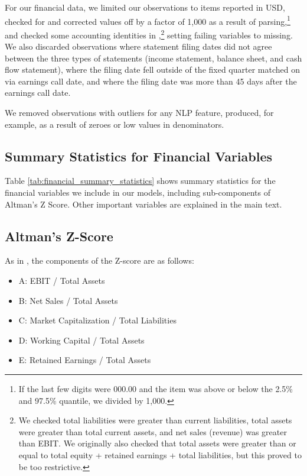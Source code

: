 \documentclass{article}[11pt]
\begin{document}
    For our financial data, we limited our observations to items reported in USD, checked for and corrected values off by a factor of 1,000 as a result of parsing,\footnote{If the last few digits were 000.00 and the item was above or below the 2.5\% and 97.5\% quantile, we divided by 1,000.} and checked some accounting identities in \cite{das_credit_2023},\footnote{We checked total liabilities were greater than current liabilities, total assets were greater than total current assets, and net sales (revenue) was greater than EBIT. We originally also checked that total assets were greater than or equal to total equity + retained earnings + total liabilities, but this proved to be too restrictive.} setting failing variables to missing. We also discarded observations where statement filing dates did not agree between the three types of statements (income statement, balance sheet, and cash flow statement), where the filing date fell outside of the fixed quarter matched on via earnings call date, and where the filing date was more than 45 days after the earnings call date.

    We removed observations with outliers for any NLP feature, produced, for example, as a result of zeroes or low values in denominators.

    \clearpage
    \newpage

    \subsection{Summary Statistics for Financial Variables}

    Table \ref{tab:financial_summary_statistics} shows summary statistics for the financial variables we include in our models, including sub-components of Altman's Z Score. Other important variables are explained in the main text.

    

    \clearpage
    \newpage

    \subsection{Altman's Z-Score}

    \label{sec:altman-z-score}

    As in \cite{das_credit_2023}, the components of the Z-score are as follows:

    \begin{itemize}
        \item A: EBIT / Total Assets
        \item B: Net Sales / Total Assets
        \item C: Market Capitalization / Total Liabilities
        \item D: Working Capital / Total Assets
        \item E: Retained Earnings / Total Assets
    \end{itemize}
\end{document}
